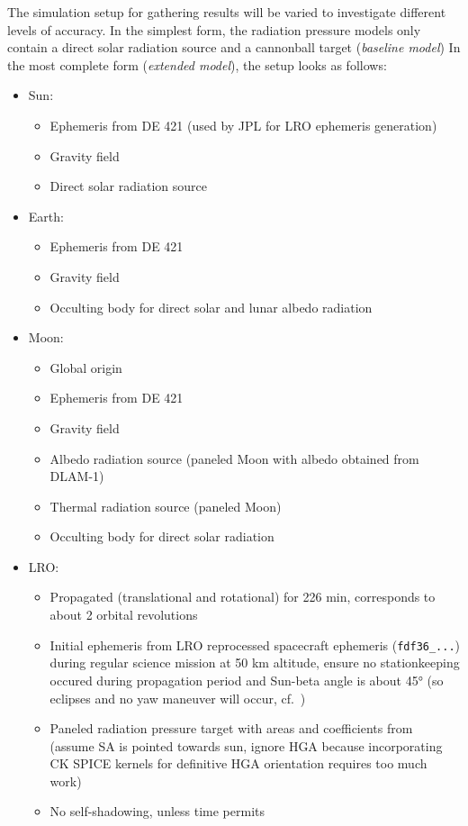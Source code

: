 \documentclass[parskip=full,DIV=15]{scrartcl}
\begin{document}
The simulation setup for gathering results will be varied to investigate different levels of accuracy. In the simplest form, the radiation pressure models only contain a direct solar radiation source and a cannonball target (\emph{baseline model}) In the most complete form (\emph{extended model}), the setup looks as follows:
\begin{itemize}
   \item Sun:
   \begin{itemize}
      \item Ephemeris from DE 421 (used by JPL for LRO ephemeris generation)
      \item Gravity field
      \item Direct solar radiation source
   \end{itemize}
   \item Earth:
   \begin{itemize}
      \item Ephemeris from DE 421
      \item Gravity field
      \item Occulting body for direct solar and lunar albedo radiation
   \end{itemize}
   \item Moon:
   \begin{itemize}
      \item Global origin
      \item Ephemeris from DE 421
      \item Gravity field
      \item Albedo radiation source (paneled Moon with albedo obtained from DLAM-1)
      \item Thermal radiation source (paneled Moon)
      \item Occulting body for direct solar radiation
   \end{itemize}
   \item LRO:
   \begin{itemize}
      \item Propagated (translational and rotational) for 226 min, corresponds to about 2 orbital revolutions
      \item Initial ephemeris from LRO reprocessed spacecraft ephemeris (\texttt{fdf36\_...}) during regular science mission at 50 km altitude, ensure no stationkeeping occured during propagation period and Sun-beta angle is about \ang{45} (so eclipses and no yaw maneuver will occur, cf.~\cite[Fig.~12]{Tooley2010})
      \item Paneled radiation pressure target with areas and coefficients from \textcite{Smith2008} (assume SA is pointed towards sun, ignore HGA because incorporating CK SPICE kernels for definitive HGA orientation requires too much work)
      \item No self-shadowing, unless time permits
   \end{itemize}
\end{itemize}
\end{document}
